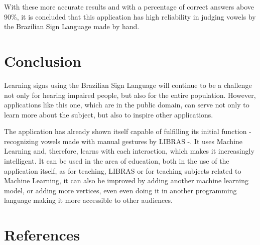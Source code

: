 \documentclass[a4paper, 12pt]{article}
\begin{document}
With these more accurate results and with a percentage of correct answers above 90\%, it is concluded that this application has high reliability in judging vowels by the Brazilian Sign Language made by hand.

\section{Conclusion}

Learning signs using the Brazilian Sign Language will continue to be a challenge not only for hearing impaired people, but also for the entire population. However, applications like this one, which are in the public domain, can serve not only to learn more about the subject, but also to inspire other applications.

The application has already shown itself capable of fulfilling its initial function - recognizing vowels made with manual gestures by LIBRAS -. It uses Machine Learning and, therefore, learns with each interaction, which makes it increasingly intelligent. It can be used in the area of education, both in the use of the application itself, as for teaching, LIBRAS or for teaching subjects related to Machine Learning, it can also be improved by adding another machine learning model, or adding more vertices, even even doing it in another programming language making it more accessible to other audiences.

\newpage
{\color{white}\section{References}}


\end{document}
